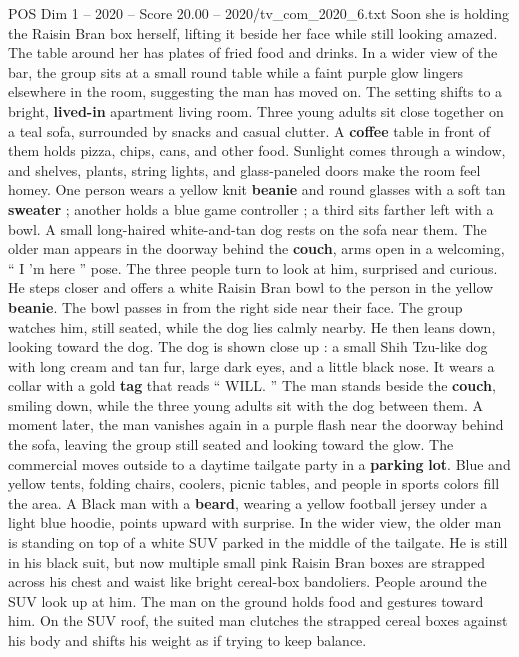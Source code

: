\begin{textsample}{POS Dim 1 – 2020 – Score 20.00 – 2020/tv\_com\_2020\_6.txt}
Soon she is holding the Raisin Bran box herself, lifting it beside her face while still looking amazed.
The table around her has plates of fried food and drinks.
In a wider view of the bar, the group sits at a small round table while a faint purple glow lingers elsewhere in the room, suggesting the man has moved on.
The setting shifts to a bright, \textbf{lived-in} apartment living room.
Three young adults sit close together on a teal sofa, surrounded by snacks and casual clutter.
A \textbf{coffee} table in front of them holds pizza, chips, cans, and other food.
Sunlight comes through a window, and shelves, plants, string lights, and glass-paneled doors make the room feel homey.
One person wears a yellow knit \textbf{beanie} and round glasses with a soft tan \textbf{sweater} ; another holds a blue game controller ; a third sits farther left with a bowl.
A small long-haired white-and-tan dog rests on the sofa near them.
The older man appears in the doorway behind the \textbf{couch}, arms open in a welcoming, “ I ’m here ” pose.
The three people turn to look at him, surprised and curious.
He steps closer and offers a white Raisin Bran bowl to the person in the yellow \textbf{beanie}.
The bowl passes in from the right side near their face.
The group watches him, still seated, while the dog lies calmly nearby.
He then leans down, looking toward the dog.
The dog is shown close up : a small Shih Tzu-like dog with long cream and tan fur, large dark eyes, and a little black nose.
It wears a collar with a gold \textbf{tag} that reads “ WILL. ” The man stands beside the \textbf{couch}, smiling down, while the three young adults sit with the dog between them.
A moment later, the man vanishes again in a purple flash near the doorway behind the sofa, leaving the group still seated and looking toward the glow.
The commercial moves outside to a daytime tailgate party in a \textbf{parking} \textbf{lot}.
Blue and yellow tents, folding chairs, coolers, picnic tables, and people in sports colors fill the area.
A Black man with a \textbf{beard}, wearing a yellow football jersey under a light blue hoodie, points upward with surprise.
In the wider view, the older man is standing on top of a white SUV parked in the middle of the tailgate.
He is still in his black suit, but now multiple small pink Raisin Bran boxes are strapped across his chest and waist like bright cereal-box bandoliers.
People around the SUV look up at him.
The man on the ground holds food and gestures toward him.
On the SUV roof, the suited man clutches the strapped cereal boxes against his body and shifts his weight as if trying to keep balance.

\end{textsample}
